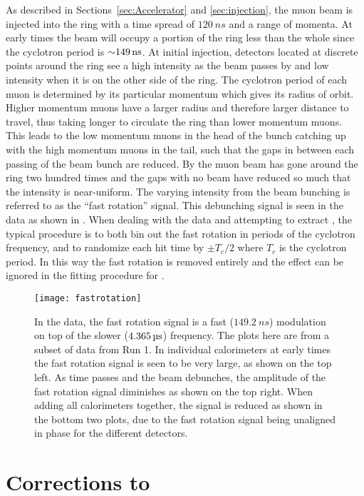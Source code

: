 As described in Sections~\ref{sec:Accelerator} and \ref{sec:injection}, the muon beam is injected into the ring with a time spread of $\SI{120}{ns}$ and a range of momenta. At early times the beam will occupy a portion of the ring less than the whole since the cyclotron period is $\SI{\sim149}{ns}$. At initial injection, detectors located at discrete points around the ring see a high intensity as the beam passes by and low intensity when it is on the other side of the ring. The cyclotron period of each muon is determined by its particular momentum which gives its radius of orbit. Higher momentum muons have a larger radius and therefore larger distance to travel, thus taking longer to circulate the ring than lower momentum muons. This leads to the low momentum muons in the head of the bunch catching up with the high momentum muons in the tail, such that the gaps in between each passing of the beam bunch are reduced. By  the muon beam has gone around the ring two hundred times and the gaps with no beam have reduced so much that the intensity is near-uniform. The varying intensity from the beam bunching is referred to as the ``fast rotation'' signal. This debunching signal is seen in the data as shown in . When dealing with the data and attempting to extract \wa, the typical procedure is to both bin out the fast rotation in periods of the cyclotron frequency, and to randomize each hit time by $\pm T_{c}/2$ where $T_{c}$ is the cyclotron period. In this way the fast rotation is removed entirely and the effect can be ignored in the fitting procedure for \wa.


\begin{figure}
    \centering
    \texttt{[image: fastrotation]}
    \caption[Beam debunching fast rotation]{In the data, the fast rotation signal is a fast ($\SI{149.2}{ns}$) modulation on top of the slower ($\SI{4.365}{\micro s}$) \wa frequency. The plots here are from a subset of data from Run 1. In individual calorimeters at early times the fast rotation signal is seen to be very large, as shown on the top left. As time passes and the beam debunches, the amplitude of the fast rotation signal diminishes as shown on the top right. When adding all calorimeters together, the signal is reduced as shown in the bottom two plots, due to the fast rotation signal being unaligned in phase for the different detectors.}
    \label{fig:fastrotation}
\end{figure}



\section{Corrections to \texorpdfstring{\wa}{wa}}
\label{sec:corrections}

